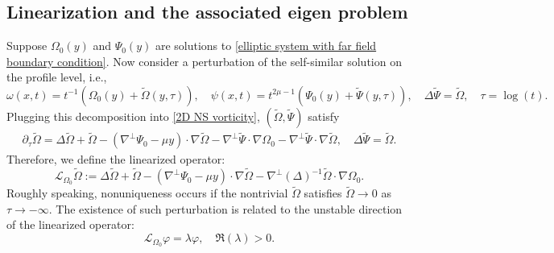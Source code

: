\documentclass{article}
\newcommand{\om}{\omega}
\newcommand{\vp}{\varphi}
\newcommand{\pa}{\partial}
\numberwithin{equation}{section}
\newcommand{\Lc}{\mathcal{L}}
\begin{document}
\subsection{Linearization and the associated eigen problem}
Suppose $\Omega_0(y)$ and $\Psi_0(y)$ are solutions to \eqref{elliptic system with far field boundary condition}. 
Now consider a perturbation of the self-similar solution on the profile level, i.e.,
\[
    \om(x,t) = t^{-1}(\Omega_0(y)+\tilde \Omega(y,\tau)),\quad \psi(x,t) = t^{2\mu-1}(\Psi_0(y)+\tilde\Psi(y,\tau)),\quad \Delta\tilde \Psi = \tilde\Omega,\quad \tau = \log(t).
\]
Plugging this decomposition into \eqref{2D NS vorticity}, $(\tilde \Omega,\tilde \Psi)$ satisfy
\begin{align}
    \pa_\tau\tilde \Omega = \Delta\tilde\Omega +\tilde\Omega-(\nabla^\perp\Psi_0-\mu y)\cdot\nabla \tilde\Omega - \nabla^\perp\tilde\Psi\cdot\nabla\Omega_0 - \nabla^\perp\tilde\Psi\cdot\nabla\tilde\Omega,\quad
    \Delta\tilde\Psi = \tilde\Omega.
\end{align}
Therefore, we define the linearized operator:
\begin{equation}
    \Lc_{\Omega_0} \tilde\Omega :=\Delta\tilde\Omega +\tilde\Omega-(\nabla^\perp\Psi_0-\mu y)\cdot\nabla \tilde\Omega - \nabla^\perp(\Delta)^{-1}\tilde\Omega\cdot\nabla\Omega_0. 
\end{equation}
Roughly speaking, nonuniqueness occurs if the nontrivial $\tilde\Omega$ satisfies $\tilde\Omega\to 0$ as $\tau\to-\infty$. The existence of such perturbation is related to the unstable direction of the linearized operator:
\begin{equation}
    \Lc_{\Omega_0}\vp = \lambda\vp,\quad \Re(\lambda)>0.
\end{equation}
\end{document}
